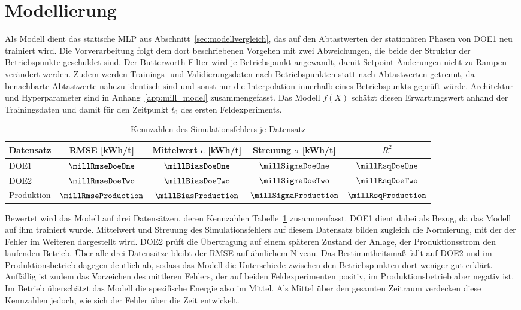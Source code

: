\section{Modellierung} \label{sec:mill_modellierung}
%

%
Als Modell dient das statische \ac{MLP} aus Abschnitt~\ref{sec:modellvergleich}, das auf den Abtastwerten der stationären Phasen von DOE1 neu trainiert wird. Die Vorverarbeitung folgt dem dort beschriebenen Vorgehen mit zwei Abweichungen, die beide der Struktur der Betriebspunkte geschuldet sind. Der Butterworth-Filter wird je Betriebspunkt angewandt, damit Setpoint-Änderungen nicht zu Rampen verändert werden. Zudem werden Trainings- und Validierungsdaten nach Betriebspunkten statt nach Abtastwerten getrennt, da benachbarte Abtastwerte nahezu identisch sind und sonst nur die Interpolation innerhalb eines Betriebspunkts geprüft würde. Architektur und Hyperparameter sind in Anhang~\ref{app:mill_model} zusammengefasst. Das Modell $f(X)$ schätzt diesen Erwartungswert anhand der Trainingsdaten und damit für den Zeitpunkt $t_0$ des ersten Feldexperiments. \par
%
\begin{table}[tbp]
\centering
\caption{Kennzahlen des Simulationsfehlers je Datensatz}
\label{tab:mill_model_error}
\begin{tabular}{lcccc}
\toprule
\textbf{Datensatz} & \ac{RMSE} [kWh/t] & Mittelwert $\bar{e}$ [kWh/t] & Streuung $\sigma$ [kWh/t] & $R^2$ \\
\midrule
DOE1       & $\millRmseDoeOne$       & $\millBiasDoeOne$       & $\millSigmaDoeOne$       & $\millRsqDoeOne$ \\
DOE2       & $\millRmseDoeTwo$       & $\millBiasDoeTwo$       & $\millSigmaDoeTwo$       & $\millRsqDoeTwo$ \\
Produktion & $\millRmseProduction$   & $\millBiasProduction$   & $\millSigmaProduction$   & $\millRsqProduction$ \\
\bottomrule
\end{tabular}
\end{table}
%
Bewertet wird das Modell auf drei Datensätzen, deren Kennzahlen Tabelle~\ref{tab:mill_model_error} zusammenfasst. DOE1 dient dabei als Bezug, da das Modell auf ihm trainiert wurde. Mittelwert und Streuung des Simulationsfehlers auf diesem Datensatz bilden zugleich die Normierung, mit der der Fehler im Weiteren dargestellt wird. DOE2 prüft die Übertragung auf einem späteren Zustand der Anlage, der Produktionsstrom den laufenden Betrieb. Über alle drei Datensätze bleibt der \ac{RMSE} auf ähnlichem Niveau. Das Bestimmtheitsmaß fällt auf DOE2 und im Produktionsbetrieb dagegen deutlich ab, sodass das Modell die Unterschiede zwischen den Betriebspunkten dort weniger gut erklärt. Auffällig ist zudem das Vorzeichen des mittleren Fehlers, der auf beiden Feldexperimenten positiv, im Produktionsbetrieb aber negativ ist. Im Betrieb überschätzt das Modell die spezifische Energie also im Mittel. Als Mittel über den gesamten Zeitraum verdecken diese Kennzahlen jedoch, wie sich der Fehler über die Zeit entwickelt. \par
